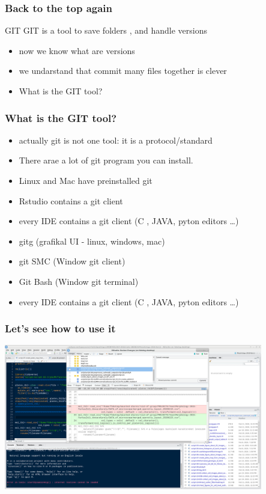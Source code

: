 \documentclass[aspectratio=169]{beamer}
\begin{document}
\begin{frame}
\frametitle<presentation>{Back to the top again}
  
  
	\begin{block}{GIT}
		GIT is a  tool to save folders , and handle versions
	\end{block}
  
	\begin{itemize}
  		\item now we know what are versions
		\item we undarstand that commit many files together is clever
		\pause
		\item What is the GIT tool?
	\end{itemize}

\end{frame}

\begin{frame}
\frametitle<presentation>{What is the GIT tool?}

	\begin{itemize}
  		\item actually git is not one tool: it is a protocol/standard
		\item There arae a lot of git program you can install.
	\end{itemize}
\pause
	\begin{itemize}
  		\item Linux and Mac have preinstalled git
		\item Rstudio contains a git client
		\item every IDE contains a git client (C , JAVA, pyton editors \ldots)
	\end{itemize}
\pause
	\begin{itemize}
  		\item gitg  (grafikal UI - linux, windows, mac)
		\item git SMC (Window git client)
		\item Git Bash (Window git terminal)
		\item every IDE contains a git client (C , JAVA, pyton editors \ldots)
	\end{itemize}


\end{frame}





\begin{frame}
\frametitle<presentation>{Let's see how to use it}
\includegraphics[height=180pt]{pictures/Screenshot_2020-02-26_08-48-52-rstudio-commit-window.png}

\end{frame}
\end{document}
